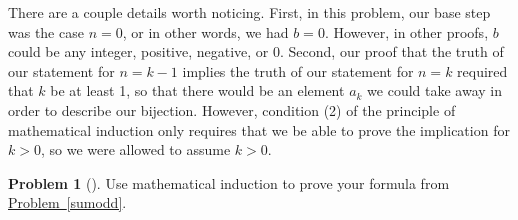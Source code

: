 \documentclass[10pt,]{book}
\theoremstyle{plain}
\theoremstyle{definition}
\newtheorem{activity}[project]{Problem}
\theoremstyle{definition}
\numberwithin{equation}{chapter}
\begin{document}
\par
\hypertarget{p-2000}{}%
There are a couple details worth noticing. First, in this problem, our base step was the case \(n=0\), or in other words, we had \(b=0\). However, in other proofs, \(b\) could be any integer, positive, negative, or 0. Second, our proof that the truth of our statement for \(n=k-1\) implies the truth of our statement for \(n=k\) required that \(k\) be at least 1, so that there would be an element \(a_k\) we could take away in order to describe our bijection. However, condition (2) of the principle of mathematical induction only requires that we be able to prove the implication for \(k>0\), so we were allowed to assume \(k>0\).%
\begin{activity}[]\marginsymbol[-1em]{} \label{activity-362}
\hypertarget{p-2001}{}%
Use mathematical induction to prove your formula from \hyperref[sumodd]{Problem~\ref{sumodd}}.%
\end{activity}
\typeout{************************************************}
\typeout{************************************************}
\end{document}
